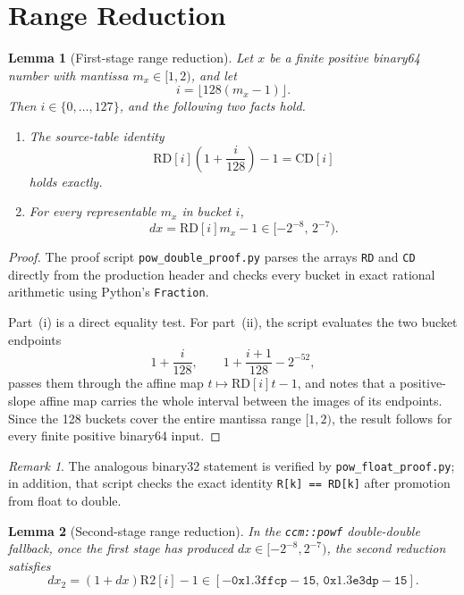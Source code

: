 \documentclass[11pt]{article}
\theoremstyle{plain}
\newtheorem{lemma}{Lemma}
\theoremstyle{remark}
\newtheorem{remark}{Remark}
\newcommand{\Powf}{\texttt{ccm::powf}}
\begin{document}
\section{Range Reduction}
\label{sec:reduction}

\begin{lemma}[First-stage range reduction]
\label{lem:stage1}
Let $x$ be a finite positive binary64 number with mantissa $m_x \in [1,2)$,
and let
\[
  i = \lfloor 128(m_x-1) \rfloor.
\]
Then $i \in \{0,\dots,127\}$, and the following two facts hold.
\begin{enumerate}[label=(\roman*)]
  \item The source-table identity
    \[
      \mathrm{RD}[i]\!\left(1 + \frac{i}{128}\right) - 1 = \mathrm{CD}[i]
    \]
    holds exactly.
  \item For every representable $m_x$ in bucket $i$,
    \[
      dx = \mathrm{RD}[i]m_x - 1 \in [-2^{-8},\,2^{-7}).
    \]
\end{enumerate}
\end{lemma}

\begin{proof}
The proof script \texttt{pow\_double\_proof.py} parses the arrays
\texttt{RD} and \texttt{CD} directly from the production header and checks
every bucket in exact rational arithmetic using Python's \texttt{Fraction}.

Part~(i) is a direct equality test.  For part~(ii), the script evaluates the
two bucket endpoints
\[
  1 + \frac{i}{128},
  \qquad
  1 + \frac{i+1}{128} - 2^{-52},
\]
passes them through the affine map $t \mapsto \mathrm{RD}[i]t - 1$, and notes
that a positive-slope affine map carries the whole interval between the images
of its endpoints.  Since the 128 buckets cover the entire mantissa range
$[1,2)$, the result follows for every finite positive binary64 input.
\end{proof}

\begin{remark}
The analogous binary32 statement is verified by
\texttt{pow\_float\_proof.py}; in addition, that script checks the exact
identity \texttt{R[k] == RD[k]} after promotion from float to double.
\end{remark}

\begin{lemma}[Second-stage range reduction]
\label{lem:stage2}
In the \Powf{} double-double fallback, once the first stage has produced
$dx \in [-2^{-8},2^{-7})$, the second reduction satisfies
\[
  dx_2 = (1+dx)\mathrm{R2}[i] - 1
  \in [-\mathtt{0x1.3ffcp-15},\,\mathtt{0x1.3e3dp-15}].
\]
\end{lemma}
\end{document}
